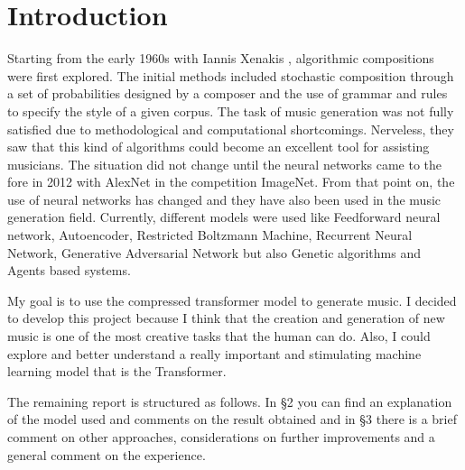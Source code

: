 \section{Introduction}
Starting from the early 1960s with Iannis Xenakis \cite{Iannis}, algorithmic compositions were first explored. The initial methods included stochastic composition through a set of probabilities designed by a composer and the use of grammar and rules to specify the style of a given corpus.
The task of music generation was not fully satisfied due to methodological and computational shortcomings. Nerveless, they saw that this kind of algorithms could become an excellent tool for assisting musicians.
The situation did not change until the neural networks came to the fore in 2012 with AlexNet \cite{AlexNet} in the competition ImageNet. From that point on, the use of neural networks has changed and they have also been used in the music generation field. Currently, different models were used like Feedforward neural network, Autoencoder, Restricted Boltzmann Machine, Recurrent Neural Network, Generative Adversarial Network but also Genetic algorithms and Agents based systems.

My goal is to use the compressed transformer model to generate music. I decided to develop this project because I think that the creation and generation of new music is one of the most creative tasks that the human can do. Also, I could explore and better understand a really important and stimulating machine learning model that is the Transformer.

The remaining report is structured as follows.
In \S2 you can find an explanation of the model used and comments on the result obtained and in \S3 there is a brief comment on other approaches, considerations on further improvements and a general comment on the experience.